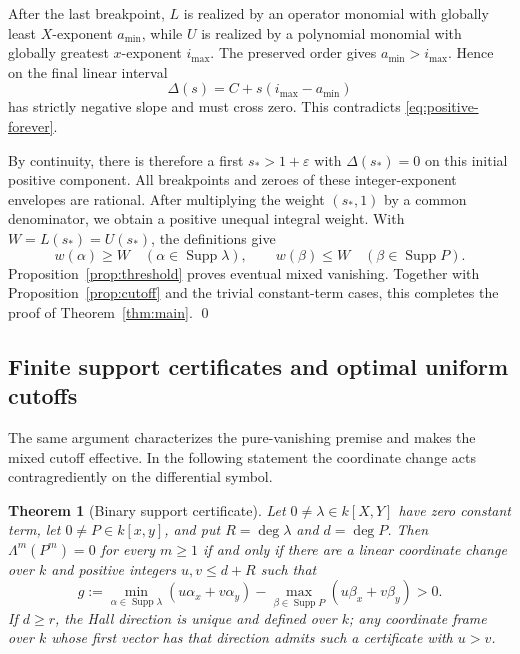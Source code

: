 \documentclass[11pt]{article}
\newtheorem{theorem}{Theorem}[section]
\newcommand{\Supp}{\operatorname{Supp}}
\begin{document}
After the last breakpoint, $L$ is realized by an operator monomial with
globally least $X$-exponent $a_{\min}$, while $U$ is realized by a polynomial
monomial with globally greatest $x$-exponent $i_{\max}$.  The preserved
order gives $a_{\min}>i_{\max}$.  Hence on the final linear interval
\[
 \Delta(s)=C+s(i_{\max}-a_{\min})
\]
has strictly negative slope and must cross zero.  This contradicts
\eqref{eq:positive-forever}.

By continuity, there is therefore a first
$s_*>1+\varepsilon$ with $\Delta(s_*)=0$ on this initial positive
component.  All breakpoints and zeroes of these
integer-exponent envelopes are rational.  After multiplying the weight
$(s_*,1)$ by a common denominator, we obtain a positive unequal integral
weight.  With $W=L(s_*)=U(s_*)$, the definitions give
\[
 w(\alpha)\geq W\quad(\alpha\in\Supp\lambda),
 \qquad
 w(\beta)\leq W\quad(\beta\in\Supp P).
\]
Proposition~\ref{prop:threshold} proves eventual mixed vanishing.  Together
with Proposition~\ref{prop:cutoff} and the trivial constant-term cases,
this completes the proof of Theorem~\ref{thm:main}.  \qed

\subsection{Finite support certificates and optimal uniform cutoffs}

The same argument characterizes the pure-vanishing premise and makes the
mixed cutoff effective.  In the following statement the coordinate change
acts contragrediently on the differential symbol.

\begin{theorem}[Binary support certificate]\label{thm:support-certificate}
Let $0\ne\lambda\in k[X,Y]$ have zero constant term, let $0\ne P\in k[x,y]$,
and put $R=\deg\lambda$ and $d=\deg P$.  Then
$\Lambda^m(P^m)=0$ for every $m\geq1$ if and only if there are a linear
coordinate change over $k$ and positive integers $u,v\leq d+R$ such that
\begin{equation}\label{eq:strict-certificate}
 g:=\min_{\alpha\in\Supp\lambda}(u\alpha_x+v\alpha_y)
       -\max_{\beta\in\Supp P}(u\beta_x+v\beta_y)>0.
\end{equation}
If $d\geq r$, the Hall direction is unique and defined over $k$; any
coordinate frame over $k$ whose first vector has that direction admits
such a certificate with $u>v$.
\end{theorem}
\end{document}

